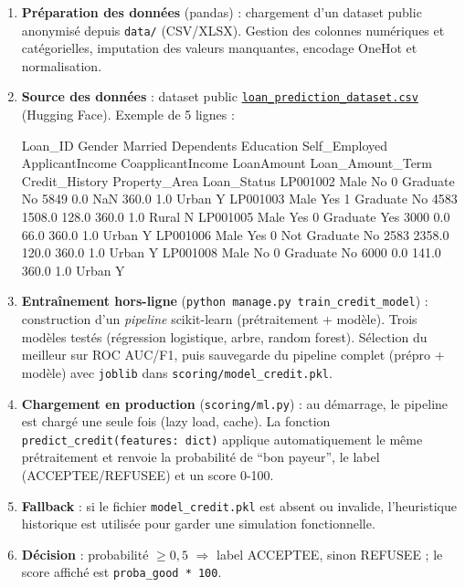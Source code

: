 \documentclass[12pt,a4paper]{report}
\begin{document}
\begin{enumerate}[leftmargin=1.3cm]
    \item \textbf{Préparation des données} (pandas) : chargement d'un dataset public anonymisé depuis \texttt{data/} (CSV/XLSX). Gestion des colonnes numériques et catégorielles, imputation des valeurs manquantes, encodage OneHot et normalisation.
    \item \textbf{Source des données} : dataset public \href{https://huggingface.co/datasets/mariosyahirhalimm/loan_prediction_dataset/blob/main/loan_prediction_dataset.csv}{\texttt{loan\_prediction\_dataset.csv}} (Hugging Face). Exemple de 5 lignes :
\begin{CodeBlock}
Loan_ID Gender Married Dependents Education     Self_Employed ApplicantIncome CoapplicantIncome LoanAmount Loan_Amount_Term Credit_History Property_Area Loan_Status
LP001002 Male   No      0         Graduate      No            5849            0.0               NaN        360.0            1.0            Urban         Y
LP001003 Male   Yes     1         Graduate      No            4583            1508.0            128.0      360.0            1.0            Rural         N
LP001005 Male   Yes     0         Graduate      Yes           3000            0.0               66.0       360.0            1.0            Urban         Y
LP001006 Male   Yes     0         Not Graduate  No            2583            2358.0            120.0      360.0            1.0            Urban         Y
LP001008 Male   No      0         Graduate      No            6000            0.0               141.0      360.0            1.0            Urban         Y
\end{CodeBlock}
    \item \textbf{Entraînement hors-ligne} (\texttt{python manage.py train\_credit\_model}) : construction d'un \textit{pipeline} scikit-learn (prétraitement + modèle). Trois modèles testés (régression logistique, arbre, random forest). Sélection du meilleur sur ROC AUC/F1, puis sauvegarde du pipeline complet (prépro + modèle) avec \texttt{joblib} dans \texttt{scoring/model\_credit.pkl}.
    \item \textbf{Chargement en production} (\texttt{scoring/ml.py}) : au démarrage, le pipeline est chargé une seule fois (lazy load, cache). La fonction \texttt{predict\_credit(features: dict)} applique automatiquement le même prétraitement et renvoie la probabilité de “bon payeur”, le label (ACCEPTEE/REFUSEE) et un score 0-100.
    \item \textbf{Fallback} : si le fichier \texttt{model\_credit.pkl} est absent ou invalide, l'heuristique historique est utilisée pour garder une simulation fonctionnelle.
    \item \textbf{Décision} : probabilité $\geq 0{,}5$ $\Rightarrow$ label ACCEPTEE, sinon REFUSEE ; le score affiché est \texttt{proba\_good * 100}.
\end{enumerate}
\end{document}
